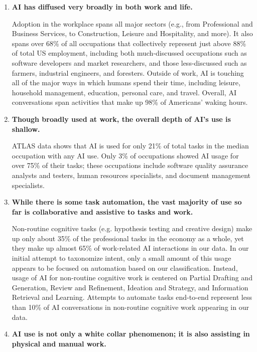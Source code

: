\documentclass[11pt,a4paper]{article}
\begin{document}
\begin{enumerate}
    \item \textbf{AI has diffused very broadly in both work and life.} 
    
    Adoption in the workplace spans all major sectors (e.g., from Professional and Business Services, to Construction, Leisure and Hospitality, and more). It also spans over 68\% of all occupations that collectively represent just above 88\% of total US employment, including both much-discussed occupations such as software developers and market researchers, and those less-discussed such as farmers, industrial engineers, and foresters. Outside of work, AI is touching all of the major ways in which humans spend their time, including leisure, household management, education, personal care, and travel. Overall, AI conversations span activities that make up 98\% of Americans' waking hours.

    \item \textbf{Though broadly used at work, the overall depth of AI's use is shallow.} 
    
    ATLAS data shows that AI is used for only 21\% of total tasks in the median occupation with any AI use. Only 3\% of occupations showed AI usage for over 75\% of their tasks; these occupations include software quality assurance analysts and testers, human resources specialists, and document management specialists.
    
    \item \textbf{While there is some task automation, the vast majority of use so far is collaborative and assistive to tasks and work.} 
    
    Non-routine cognitive tasks (e.g. hypothesis testing and creative design) make up only about 35\% of the professional tasks in the economy as a whole, yet they make up almost 65\% of work-related AI interactions in our data. In our initial attempt to taxonomize intent, only a small amount of this usage appears to be focused on automation based on our classification. Instead, usage of AI for non-routine cognitive work is centered on Partial Drafting and Generation, Review and Refinement, Ideation and Strategy, and Information Retrieval and Learning. Attempts to automate tasks end-to-end represent less than 10\% of AI conversations in non-routine cognitive work appearing in our data.

    \item \textbf{AI use is not only a white collar phenomenon; it is also assisting in physical and manual work.} 
    

\end{enumerate}
\end{document}
